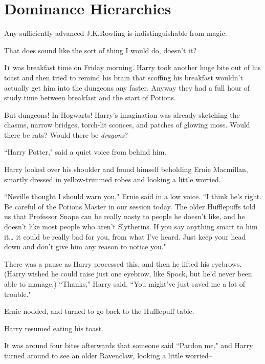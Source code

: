 \chapter{Dominance Hierarchies}

\begin{chapterOpeningAuthorNote}
Any sufficiently advanced J.\?K.\?Rowling is indistinguishable from magic.
\end{chapterOpeningAuthorNote}
\begin{chapterOpeningQuote}
That does sound like the sort of thing I would do, doesn't it?
\end{chapterOpeningQuote}

\lettrine{I}{t} was breakfast time on Friday morning. Harry took another huge bite out of his toast and then tried to remind his brain that scoffing his breakfast wouldn't actually get him into the dungeons any faster. Anyway they had a full hour of study time between breakfast and the start of Potions.

But dungeons! In Hogwarts! Harry's imagination was already sketching the chasms, narrow bridges, torch-lit sconces, and patches of glowing moss. Would there be rats? Would there be \emph{dragons}?

``Harry Potter," said a quiet voice from behind him.

Harry looked over his shoulder and found himself beholding Ernie Macmillan, smartly dressed in yellow-trimmed robes and looking a little worried.

``Neville thought I should warn you," Ernie said in a low voice. ``I think he's right. Be careful of the Potions Master in our session today. The older Hufflepuffs told us that Professor Snape can be really nasty to people he doesn't like, and he doesn't like most people who aren't Slytherins. If you say anything smart to him it{\ldots} it could be really bad for you, from what I've heard. Just keep your head down and don't give him any reason to notice you."

There was a pause as Harry processed this, and then he lifted his eyebrows. (Harry wished he could raise just one eyebrow, like Spock, but he'd never been able to manage.) ``Thanks," Harry said. ``You might've just saved me a lot of trouble."

Ernie nodded, and turned to go back to the Hufflepuff table.

Harry resumed eating his toast.

It was around four bites afterwards that someone said ``Pardon me," and Harry turned around to see an older Ravenclaw, looking a little worried\---

